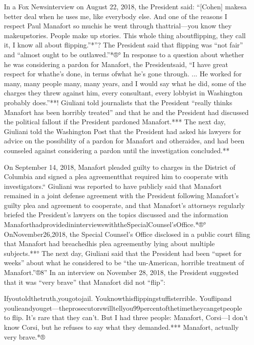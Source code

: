 In a Fox Newsinterview on August 22, 2018, the President said: “[Cohen] makesa better deal when he uses me, like everybody else. And one of the reasons I respect Paul Manafort so muchis he went through thattrial—you know they makeupstories. People make up stories. This whole thing aboutflipping, they call it, I know all about flipping.”*”? The President said that flipping was “not fair” and “almost ought to be outlawed.”*®° In response to a question about whether he was considering a pardon for Manafort, the Presidentsaid, “I have great respect for whathe’s done, in terms ofwhat he’s gone through. ... He worked for many, many people many, many years, and I would say what he did, some of the charges they threw against him, every consultant, every lobbyist in Washington probably does.”**! Giuliani told journalists that the President “really thinks Manafort has been horribly treated” and that he and the President had discussed the political fallout if the President pardoned Manafort.*** The next day, Giuliani told the Washington Post that the President had asked his lawyers for advice on the possibility of a pardon for Manafort and otheraides, and had been counseled against considering a pardon until the investigation concluded.**

On September 14, 2018, Manafort pleaded guilty to charges in the District of Columbia and signed a plea agreementthat required him to cooperate with investigators.“ Giuliani was reported to have publicly said that Manafort remained in a joint defense agreement with the President following Manafort’s guilty plea and agreement to cooperate, and that Manafort’s attorneys regularly briefed the President’s lawyers on the topics discussed and the information ManaforthadprovidedininterviewswiththeSpecialCounsel’sOffice.*®° OnNovember26,2018, the Special Counsel’s Office disclosed in a public court filing that Manafort had breachedhis plea agreementby lying about multiple subjects.**° The next day, Giuliani said that the President had been “upset for weeks” about what he considered to be “the un-American, horrible treatment of Manafort.”®8” In an interview on November 28, 2018, the President suggested that it was “very brave” that Manafort did not “flip”:

Ifyoutoldthetruth,yougotojail. Youknowthisflippingstuffisterrible. Youflipand youlieandyouget—theprosecutorswilltellyou99percentofthetimetheycangetpeople to flip. It’s rare that they can’t. But I had three people: Manafort, Corsi—l don’t know
Corsi, but he refuses to say what they demanded.*** Manafort, actually very brave.*®

